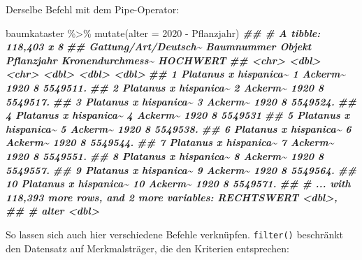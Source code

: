 \documentclass[
  ngerman,
]{article}
\newenvironment{Shaded}{\begin{snugshade}}{\end{snugshade}}
\newcommand{\AttributeTok}[1]{\textcolor[rgb]{0.77,0.63,0.00}{#1}}
\newcommand{\DecValTok}[1]{\textcolor[rgb]{0.00,0.00,0.81}{#1}}
\newcommand{\DocumentationTok}[1]{\textcolor[rgb]{0.56,0.35,0.01}{\textbf{\textit{#1}}}}
\newcommand{\FunctionTok}[1]{\textcolor[rgb]{0.00,0.00,0.00}{#1}}
\newcommand{\NormalTok}[1]{#1}
\newcommand{\SpecialCharTok}[1]{\textcolor[rgb]{0.00,0.00,0.00}{#1}}
\begin{document}
Derselbe Befehl mit dem Pipe-Operator:

\begin{Shaded}
\begin{Highlighting}[]
\NormalTok{baumkataster }\SpecialCharTok{\%\textgreater{}\%}
  \FunctionTok{mutate}\NormalTok{(}\AttributeTok{alter =} \DecValTok{2020} \SpecialCharTok{{-}}\NormalTok{ Pflanzjahr)}
\DocumentationTok{\#\# \# A tibble: 118,403 x 8}
\DocumentationTok{\#\#    \textasciigrave{}Gattung/Art/Deutsch\textasciitilde{} Baumnummer Objekt  Pflanzjahr Kronendurchmess\textasciitilde{} HOCHWERT}
\DocumentationTok{\#\#    \textless{}chr\textgreater{}                      \textless{}dbl\textgreater{} \textless{}chr\textgreater{}        \textless{}dbl\textgreater{}            \textless{}dbl\textgreater{}    \textless{}dbl\textgreater{}}
\DocumentationTok{\#\#  1 Platanus x hispanica\textasciitilde{}          1 Ackerm\textasciitilde{}       1920                8 5549511.}
\DocumentationTok{\#\#  2 Platanus x hispanica\textasciitilde{}          2 Ackerm\textasciitilde{}       1920                8 5549517.}
\DocumentationTok{\#\#  3 Platanus x hispanica\textasciitilde{}          3 Ackerm\textasciitilde{}       1920                8 5549524.}
\DocumentationTok{\#\#  4 Platanus x hispanica\textasciitilde{}          4 Ackerm\textasciitilde{}       1920                8 5549531 }
\DocumentationTok{\#\#  5 Platanus x hispanica\textasciitilde{}          5 Ackerm\textasciitilde{}       1920                8 5549538.}
\DocumentationTok{\#\#  6 Platanus x hispanica\textasciitilde{}          6 Ackerm\textasciitilde{}       1920                8 5549544.}
\DocumentationTok{\#\#  7 Platanus x hispanica\textasciitilde{}          7 Ackerm\textasciitilde{}       1920                8 5549551.}
\DocumentationTok{\#\#  8 Platanus x hispanica\textasciitilde{}          8 Ackerm\textasciitilde{}       1920                8 5549557.}
\DocumentationTok{\#\#  9 Platanus x hispanica\textasciitilde{}          9 Ackerm\textasciitilde{}       1920                8 5549564.}
\DocumentationTok{\#\# 10 Platanus x hispanica\textasciitilde{}         10 Ackerm\textasciitilde{}       1920                8 5549571.}
\DocumentationTok{\#\# \# ... with 118,393 more rows, and 2 more variables: RECHTSWERT \textless{}dbl\textgreater{},}
\DocumentationTok{\#\# \#   alter \textless{}dbl\textgreater{}}
\end{Highlighting}
\end{Shaded}

So lassen sich auch hier verschiedene Befehle verknüpfen. \texttt{filter()} beschränkt den Datensatz auf Merkmalsträger, die den Kriterien entsprechen:
\end{document}
